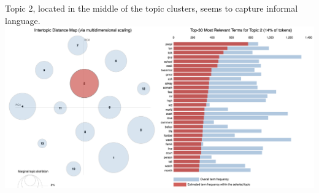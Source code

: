 \documentclass[11pt]{article}
\begin{document}
Topic 2, located in the middle of the topic clusters, seems to capture informal language. \\
\includegraphics[width=470pt]{2.png} \\
\end{document}
